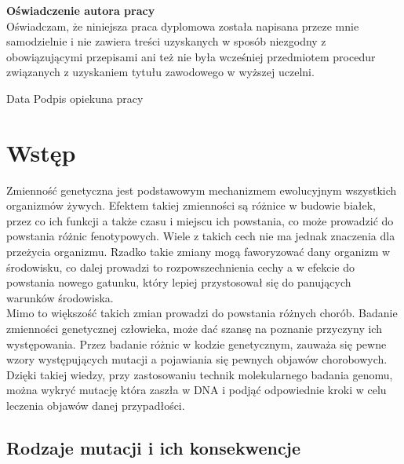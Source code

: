 \documentclass[12pt]{article}
\begin{document}
\textbf{\fontsize{14}{14}\selectfont Oświadczenie autora pracy}\\
Oświadczam, że niniejsza praca dyplomowa została napisana przeze mnie samodzielnie i nie zawiera treści uzyskanych w sposób niezgodny z obowiązującymi przepisami ani też nie była wcześniej przedmiotem procedur związanych z uzyskaniem tytułu zawodowego w wyższej uczelni.

\vspace{3cm}

Data\hspace{10cm} Podpis opiekuna pracy

\newpage

\tableofcontents
\newpage
\justify
\section{Wstęp}\indent

Zmienność genetyczna jest podstawowym mechanizmem ewolucyjnym wszystkich organizmów żywych. Efektem takiej zmienności są różnice w budowie białek, przez co ich funkcji a także czasu i miejscu ich powstania, co może prowadzić do powstania różnic fenotypowych. Wiele z takich cech nie ma jednak znaczenia dla przeżycia organizmu. Rzadko takie zmiany mogą faworyzować dany organizm w środowisku, co dalej prowadzi to rozpowszechnienia cechy a w efekcie do powstania nowego gatunku, który lepiej przystosował się do panujących warunków środowiska. \\
Mimo to większość takich zmian prowadzi do powstania różnych chorób. Badanie zmienności genetycznej człowieka, może dać szansę na poznanie przyczyny ich występowania. Przez badanie różnic w kodzie genetycznym, zauważa się pewne wzory występujących mutacji a pojawiania się pewnych objawów chorobowych. Dzięki takiej wiedzy, przy zastosowaniu technik molekularnego badania genomu, można wykryć mutację która zaszła w DNA i podjąć odpowiednie kroki w celu leczenia objawów danej przypadłości.


\subsection{Rodzaje mutacji i ich konsekwencje}\indent
\end{document}
